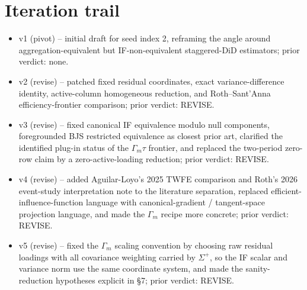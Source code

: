 \documentclass[11pt]{article}
\theoremstyle{definition}
\theoremstyle{plain}
\theoremstyle{remark}
\begin{document}
\section{Iteration trail}
\begin{itemize}[leftmargin=*]
\item v1 (pivot) -- initial draft for seed index 2, reframing the angle around aggregation-equivalent
but IF-non-equivalent staggered-DiD estimators; prior verdict: none.
\item v2 (revise) -- patched fixed residual coordinates, exact variance-difference identity,
active-column homogeneous reduction, and Roth--Sant'Anna efficiency-frontier comparison; prior
verdict: REVISE.
\item v3 (revise) -- fixed canonical IF equivalence modulo null components, foregrounded BJS restricted
equivalence as closest prior art, clarified the identified plug-in status of the \(\Gamma_m\tau\)
frontier, and replaced the two-period zero-row claim by a zero-active-loading reduction; prior
verdict: REVISE.
\item v4 (revise) -- added Aguilar-Loyo's 2025 TWFE comparison and Roth's 2026 event-study
interpretation note to the literature separation, replaced efficient-influence-function language with
canonical-gradient / tangent-space projection language, and made the \(\Gamma_m\) recipe more
concrete; prior verdict: REVISE.
\item v5 (revise) -- fixed the \(\Gamma_m\) scaling convention by choosing raw residual loadings with
all covariance weighting carried by \(\Sigma^{+}\), so the IF scalar and variance norm use the same
coordinate system, and made the sanity-reduction hypotheses explicit in §7; prior verdict: REVISE.
\end{itemize}
\end{document}
